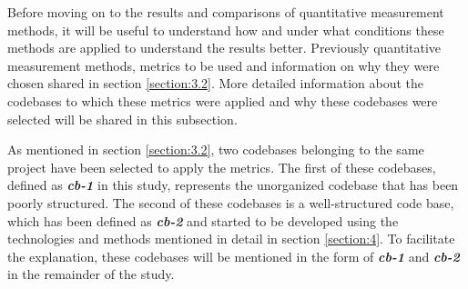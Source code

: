 Before moving on to the results and comparisons of quantitative measurement methods, it will be useful to understand how and under what conditions these methods are applied to understand the results better. Previously quantitative measurement methods, metrics to be used and information on why they were chosen shared in section \ref{section:3.2}. More detailed information about the codebases to which these metrics were applied and why these codebases were selected will be shared in this subsection.

As mentioned in section \ref{section:3.2}, two codebases belonging to the same project have been selected to apply the metrics. The first of these codebases, defined as \textbf{\textit{cb-1}} in this study, represents the unorganized codebase that has been poorly structured. The second of these codebases is a well-structured code base, which has been defined as \textbf{\textit{cb-2}} and started to be developed using the technologies and methods mentioned in detail in section \ref{section:4}. To facilitate the explanation, these codebases will be mentioned in the form of \textbf{\textit{cb-1}} and \textbf{\textit{cb-2}} in the remainder of the study.

